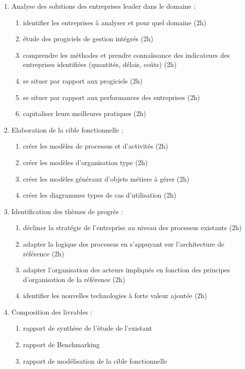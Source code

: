 \begin{enumerate}
\begin{enumerate}
            \item Analyse des solutions des entreprises leader dans le domaine : 
                \begin{enumerate}
                  \item identifier les entreprises à analyser et pour quel domaine (2h)
                  \item étude des progiciels de gestion intégrés (2h)
                  \item comprendre les méthodes et prendre connaîssance des indicateurs des entreprises identifiées (quantités, délais, coûts) (2h)
                  \item se situer par rapport aux progiciels (2h)
                  \item se situer par rapport aux performances des entreprises (2h)
                  \item capitaliser leurs meilleures pratiques (2h)
                \end{enumerate}
            \item Elaboration de la cible fonctionnelle : 
                \begin{enumerate}
                  \item créer les modèles de processus et d'activités (2h)
                  \item créer les modèles d'organisation type (2h)
                  \item créer les modèles généraux d'objets métiers à gérer (2h)
                  \item créer les diagrammes types de cas d'utilisation (2h)
                \end{enumerate}
            \item Identification des thèmes de progrès : 
                \begin{enumerate}
                  \item décliner la stratégie de l'entreprise au niveau des processus existants (2h)
                  \item adapter la logique des processus en s'appuyant sur l'architecture de référence (2h)
                  \item adapter l'organisation des acteurs impliqués en fonction des principes d'organisation de la référence (2h)
                  \item identifier les nouvelles technologies à forte valeur ajoutée (2h)
                \end{enumerate}
            \item Composition des livrables : 
                \begin{enumerate}
                  \item rapport de synthèse de l'étude de l'existant 
                  \item rapport de Benchmarking
                  \item rapport de modélisation de la cible fonctionnelle
                \end{enumerate}
          \end{enumerate}


\end{enumerate}
